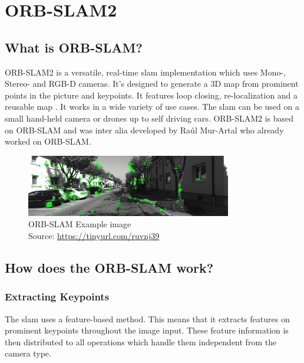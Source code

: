 
\chapter{ORB-SLAM2\authorA}\label{ref:orbslam}

\section{What is ORB-SLAM?}
ORB-SLAM2 is a versatile, real-time \gls{slam} implementation which uses Mono-, Stereo- and RGB-D cameras. It's designed to generate a 3D map from prominent points in the picture and keypoints. It features loop closing, re-localization and a reusable map \cite{orbslam2}. It works in a wide variety of use cases. The \gls{slam} can be used on a small hand-held camera or drones up to self driving cars.
ORB-SLAM2 is based on ORB-SLAM and was inter alia developed by Raúl Mur-Artal who already worked on ORB-SLAM.\newline

\begin{figure}[h]
	\centering
	\includegraphics[width=0.8\textwidth]{./media/images/orb-slam-kitti-dataset.png}
  	\caption{ORB-SLAM Example image
  	\\Source: \url{https://tinyurl.com/ruvnj39}}
  	\label{orbslamkittidataset}
\end{figure}

\section{How does the ORB-SLAM work?}

\subsection{Extracting Keypoints}
The \gls{slam} uses a feature-based method. This means that it extracts features on prominent keypoints throughout the image input. These feature information is then distributed to all operations which handle them independent from the camera type. \cite{orbslam2} \newline\newline


